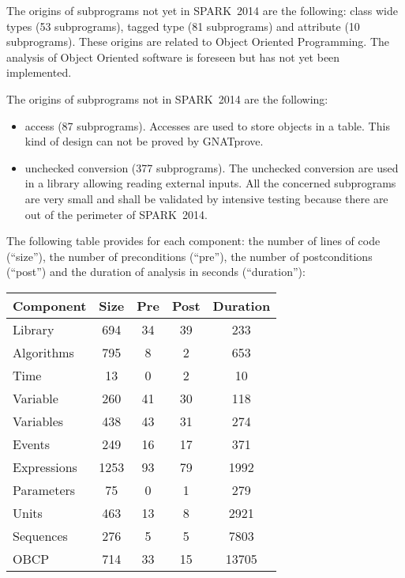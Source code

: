 \documentclass[10pt,a4paper,twocolumn]{article}
\newcommand{\gnatprove}{GNATprove\xspace}
\newcommand{\newspark}{SPARK~2014\xspace}
\begin{document}
\vspace{5mm}

The origins of subprograms not yet in \newspark are the following:
class wide types (53 subprograms),
tagged type (81 subprograms) and
attribute (10 subprograms).
These origins are related to Object Oriented Programming. The analysis of Object Oriented software is foreseen but has not yet been implemented.

The origins of subprograms not in \newspark are the following:

\begin{itemize}
\item access (87 subprograms).
      Accesses are used to store objects in a table.
      This kind of design can not be proved by \gnatprove.
\item unchecked conversion (377 subprograms).
      The unchecked conversion are used in a library allowing reading external inputs.
      All the concerned subprograms are very small and shall be validated by intensive testing because there are out of the perimeter of \newspark.
\end{itemize}

The following table provides for each component: the number of lines of code (``size''), the number of preconditions (``pre''), the number of postconditions (``post'') and the duration of analysis in seconds (``duration''):

\vspace{5mm}

\begin{tabular}{|l|c|c|c|c|}
\hline
Component   & Size & Pre & Post & Duration \\
\hline
Library     &  694 &  34 &   39 &   233 \\
\hline
Algorithms  &  795 &   8 &    2 &   653 \\
\hline
Time        &   13 &   0 &    2 &    10 \\
\hline
Variable    &  260 &  41 &   30 &   118 \\
\hline
Variables   &  438 &  43 &   31 &   274 \\
\hline
Events      &  249 &  16 &   17 &   371 \\
\hline
Expressions & 1253 &  93 &   79 &  1992 \\
\hline
Parameters  &   75 &   0 &    1 &   279 \\
\hline
Units       &  463 &  13 &    8 &  2921 \\
\hline
Sequences   &  276 &   5 &    5 &  7803 \\
\hline
OBCP        &  714 &  33 &   15 & 13705 \\
\hline
\end{tabular}
\end{document}
